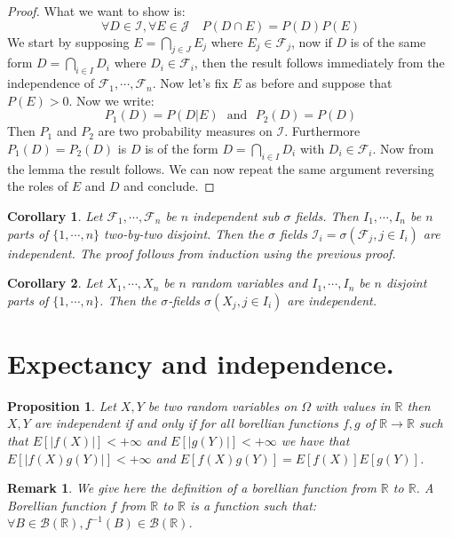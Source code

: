 \documentclass[10pt,a4paper]{book}
\newtheorem{corollary}{Corollary}[theorem]
\newtheorem{proposition}{Proposition}[section]
\newtheorem*{remark}{Remark}
\theoremstyle{definition}
\begin{document}
\begin{proof} What we want to show is:
\[
\forall D \in \mathcal{I}, \forall E \in \mathcal{J} \quad P(D \cap E) = P(D) P(E)
\]
We start by supposing $E = \bigcap_{j\in J} E_j$ where $E_j \in \mathcal{F}_j$, now if $D$ is of the same form $D = \bigcap_{i \in I} D_i$ where $D_i \in \mathcal{F}_i$, then the result follows immediately from the independence of $\mathcal{F}_1, \cdots, \mathcal{F}_n$. Now let's fix $E$ as before and suppose that $P(E) > 0$. Now we write:
\[
P_1(D) = P(D | E) \mbox{~~and~~} P_2(D) = P(D)
\] 
Then $P_1$ and $P_2$ are two probability measures on $\mathcal{I}$. Furthermore $P_1(D) = P_2(D)$ is $D$ is of the form $D = \bigcap_{i \in I} D_i$ with $D_i \in \mathcal{F}_i$. Now from the lemma the result follows. We can now repeat the same argument reversing the roles of $E$ and $D$ and conclude.
\end{proof}

\begin{corollary}
Let $\mathcal{F}_1, \cdots, \mathcal{F}_n$ be $n$ independent sub $\sigma$ fields. Then $I_1, \cdots, I_n$ be $n$ parts of $\{1, \cdots, n\}$ two-by-two disjoint. Then the $\sigma$ fields $\mathcal{I}_i = \sigma(\mathcal{F}_j, j \in I_i)$ are independent. The proof follows from induction using the previous proof.
\end{corollary}

\begin{corollary}

Let $X_1, \cdots, X_n$ be $n$ random variables and $I_1, \cdots, I_n$ be $n$ disjoint parts of $\{1, \cdots, n\}$. Then the $\sigma$-fields $\sigma(X_j, j \in I_i)$ are independent. 

\end{corollary}

\section{Expectancy and independence.}

\begin{proposition}
Let $X, Y$ be two random variables on $\Omega$ with values in $\mathbb{R}$ then $X, Y$ are independent if and only if for all borellian functions $f, g$ of $\mathbb{R} \to \mathbb{R}$ such that $E[|f(X)|] < +\infty$ and $E[|g(Y)|] < +\infty$ we have that $E[|f(X) g(Y)|] < +\infty$ and $E[f(X)g(Y)] = E[f(X)]E[g(Y)]$. 
\end{proposition}

\begin{remark} We give here the definition of a borellian function from $\mathbb{R}$ to $\mathbb{R}$. A Borellian function $f$ from $\mathbb{R}$ to $\mathbb{R}$ is a function such that: $\forall B \in \mathcal{B}(\mathbb{R}), f^{-1}(B) \in \mathcal{B}(\mathbb{R})$. 
\end{remark}
\end{document}
